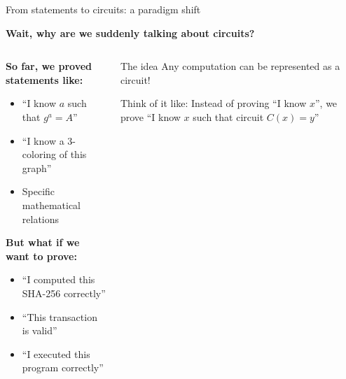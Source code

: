 \documentclass[aspectratio=169, lualatex, handout]{beamer}
\begin{document}
\begin{frame}{From statements to circuits: a paradigm shift}
	\begin{center}
		\textbf{Wait, why are we suddenly talking about circuits?}
	\end{center}
	\vspace{0.5em}
	\begin{columns}[c]
		\begin{column}{0.5\textwidth}
			\textbf{So far, we proved statements like:}
			\begin{itemize}
				\item ``I know $a$ such that $g^a = A$''
				\item ``I know a 3-coloring of this graph''
				\item Specific mathematical relations
			\end{itemize}
			\vspace{0.5em}
			\textbf{But what if we want to prove:}
			\begin{itemize}
				\item ``I computed this SHA-256 correctly''
				\item ``This transaction is valid''
				\item ``I executed this program correctly''
			\end{itemize}
		\end{column}
		\begin{column}{0.5\textwidth}
			\begin{alertblock}{The idea}
				Any computation can be represented as a circuit!
			\end{alertblock}
			\vspace{0.5em}
			\begin{exampleblock}{Think of it like:}
				Instead of proving ``I know $x$'', we prove ``I know $x$ such that circuit $C(x) = y$''
			\end{exampleblock}
		\end{column}
	\end{columns}
\end{frame}
\end{document}
